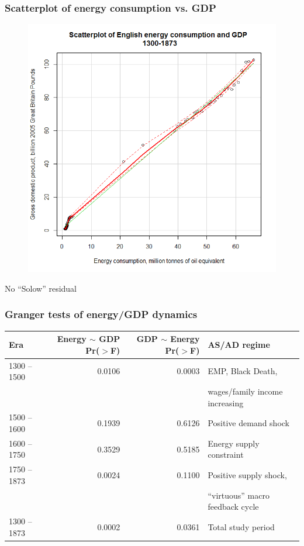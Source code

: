 \documentclass[final]{beamer}
\begin{document}
\begin{frame}
\frametitle{Scatterplot of energy consumption vs. GDP}
\begin{figure}[p!]
\center
\label{fig:scatterplot}
\includegraphics[height=0.8\textheight]{scatterplot.png}
\end{figure}
No ``Solow'' residual
\end{frame}

\begin{frame}
\frametitle{Granger tests of energy/GDP dynamics}
\scriptsize{
\begin{table}[p!]
\label{tbl:grangerEnergyGdp}
\begin{tabular}{lrrl}
Era&Energy $\sim$ GDP Pr($>$F)& GDP $\sim$ Energy Pr($>$F)&AS/AD regime\\
\hline
1300 -- 1500&0.0106&0.0003&EMP, Black Death, \\&&&wages/family income increasing\\
1500 -- 1600&0.1939&0.6126&Positive demand shock\\
1600 -- 1750&0.3529&0.5185&Energy supply constraint\\
1750 -- 1873&0.0024&0.1100&Positive supply shock,\\&&&``virtuous'' macro feedback cycle\\
\hline
1300 -- 1873& 0.0002& 0.0361&Total study period\\
\end{tabular}
\end{table}
}
\end{frame}
\end{document}
